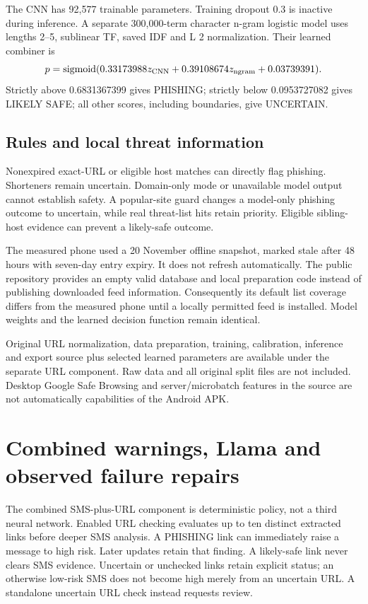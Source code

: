 \documentclass[11pt,a4paper,oneside]{report}
\begin{document}
The CNN has 92,577 trainable parameters. Training dropout 0.3 is inactive during inference. A separate 300,000-term character n-gram logistic model uses lengths 2--5, sublinear TF, saved IDF and L 2 normalization. Their learned combiner is
\[
p=\operatorname{sigmoid}(0.33173988 z_{\rm CNN}
 +0.39108674 z_{\rm ngram}+0.03739391).
\]
Strictly above 0.6831367399 gives PHISHING; strictly below 0.0953727082 gives LIKELY SAFE; all other scores, including boundaries, give UNCERTAIN.

\section{Rules and local threat information}
Nonexpired exact-URL or eligible host matches can directly flag phishing. Shorteners remain uncertain. Domain-only mode or unavailable model output cannot establish safety. A popular-site guard changes a model-only phishing outcome to uncertain, while real threat-list hits retain priority. Eligible sibling-host evidence can prevent a likely-safe outcome.

The measured phone used a 20 November offline snapshot, marked stale after 48 hours with seven-day entry expiry. It does not refresh automatically. The public repository provides an empty valid database and local preparation code instead of publishing downloaded feed information. Consequently its default list coverage differs from the measured phone until a locally permitted feed is installed. Model weights and the learned decision function remain identical.

Original URL normalization, data preparation, training, calibration, inference and export source plus selected learned parameters are available under the separate URL component. Raw data and all original split files are not included. Desktop Google Safe Browsing and server/microbatch features in the source are not automatically capabilities of the Android APK.

\chapter{Combined warnings, Llama and observed failure repairs}
The combined SMS-plus-URL component is deterministic policy, not a third neural network. Enabled URL checking evaluates up to ten distinct extracted links before deeper SMS analysis. A PHISHING link can immediately raise a message to high risk. Later updates retain that finding. A likely-safe link never clears SMS evidence. Uncertain or unchecked links retain explicit status; an otherwise low-risk SMS does not become high merely from an uncertain URL. A standalone uncertain URL check instead requests review.
\end{document}

